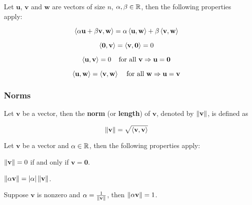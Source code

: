 \documentclass[a4paper,12pt]{article}
\begin{document}
\begin{pst}
  Let $\mathbf{u}$, $\mathbf{v}$ and $\mathbf{w}$ are vectors of size $n$, $\alpha,\beta\in\mathbb{R}$, then the following properties apply:

  \begin{alist}
    \item
    
    $$\left\langle \alpha\mathbf{u}+\beta\mathbf{v},\mathbf{w}\right\rangle=\alpha\left\langle \mathbf{u},\mathbf{w}\right\rangle+\beta\left\langle \mathbf{v},\mathbf{w}\right\rangle$$

    \item
    
    $$\left\langle \mathbf{0},\mathbf{v}\right\rangle=\left\langle \mathbf{v},\mathbf{0}\right\rangle=0$$

    \item
    
    $$\left\langle \mathbf{u},\mathbf{v}\right\rangle=0\;\;\;\;\text{for all }\mathbf{v}\Rightarrow\mathbf{u}=\mathbf{0}$$

    \item
    
    $$\left\langle \mathbf{u},\mathbf{w}\right\rangle=\left\langle \mathbf{v},\mathbf{w}\right\rangle\;\;\;\;\text{for all }\mathbf{w}\Rightarrow\mathbf{u}=\mathbf{v}$$
  \end{alist}
\end{pst}

\subsubsection{Norms}
\begin{dft}
  Let $\mathbf{v}$ be a vector, then the \textbf{norm} (or \textbf{length}) of $\mathbf{v}$, denoted by $\left\| \mathbf{v}\right\|$, is defined as

  $$\left\| \mathbf{v}\right\|=\sqrt{\left\langle \mathbf{v},\mathbf{v}\right\rangle}$$
\end{dft}\n

\begin{pst}
  Let $\mathbf{v}$ be a vector and $\alpha\in\mathbb{R}$, then the following properties apply:

  \begin{alist}
    \item $\left\| \mathbf{v}\right\|=0$ if and only if $\mathbf{v}=\mathbf{0}$.
    \item $\left\| \alpha\mathbf{v}\right\|=\left| \alpha\right|\left\| \mathbf{v}\right\|$.
    \item Suppose $\mathbf{v}$ is nonzero and $\alpha=\frac{1}{\left\| \mathbf{v}\right\|}$, then $\left\| \alpha\mathbf{v}\right\|=1$.
  \end{alist}
\end{pst}\n
\end{document}
